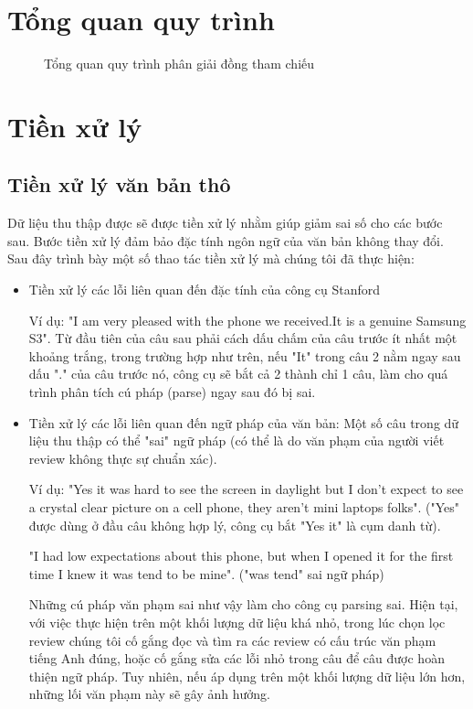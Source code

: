 \documentclass[12pt]{report}
\begin{document}
		\section{Tổng quan quy trình}
			\begin{figure}[H] 
				\centering				
				\resizebox{160mm}{!}{}
				\caption{Tổng quan quy trình phân giải đồng tham chiếu}							
			\end{figure}			
		\section{Tiền xử lý}
		\subsection*{Tiền xử lý văn bản thô}
		\par Dữ liệu thu thập được sẽ được tiền xử lý nhằm giúp giảm sai số cho các bước sau. Bước tiền xử lý đảm bảo đặc tính ngôn ngữ của văn bản không thay đổi. Sau đây trình bày một số thao tác tiền xử lý mà chúng tôi đã thực hiện:
		\begin{itemize}
			\item{Tiền xử lý các lỗi liên quan đến đặc tính của công cụ Stanford
				\par Ví dụ: "I am very pleased with the phone we received.It is a genuine Samsung S3". Từ đầu tiên của câu sau phải cách dấu chấm của câu trước ít nhất một khoảng trắng, trong trường hợp như trên, nếu "It" trong câu 2 nằm ngay sau dấu "." của câu trước nó, công cụ sẽ bắt cả 2 thành chỉ 1 câu, làm cho quá trình phân tích cú pháp (parse) ngay sau đó bị sai.}
			\item{Tiền xử lý các lỗi liên quan đến ngữ pháp của văn bản: Một số câu trong dữ liệu thu thập có thể "sai" ngữ pháp (có thể là do văn phạm của người viết review không thực sự chuẩn xác). 
				\par Ví dụ: "Yes it was hard to see the screen in daylight but I don't expect to see a crystal clear picture on a cell phone, they aren't mini laptops folks". ("Yes" được dùng ở đầu câu không hợp lý, công cụ bắt "Yes it" là cụm danh từ).			
				\par "I had low expectations about this phone, but when I opened it for the first time I knew it was tend to be mine". ("was tend" sai ngữ pháp)
				\par Những cú pháp văn phạm sai như vậy làm cho công cụ parsing sai. Hiện tại, với việc thực hiện trên một khối lượng dữ liệu khá nhỏ, trong lúc chọn lọc review chúng tôi cố gắng đọc và tìm ra các review có cấu trúc văn phạm tiếng Anh đúng, hoặc cố gắng sửa các lỗi nhỏ trong câu để câu được hoàn thiện ngữ pháp. Tuy nhiên, nếu áp dụng trên một khối lượng dữ liệu lớn hơn, những lối văn phạm này sẽ gây ảnh hưởng.} 
		\end{itemize}
\end{document}
